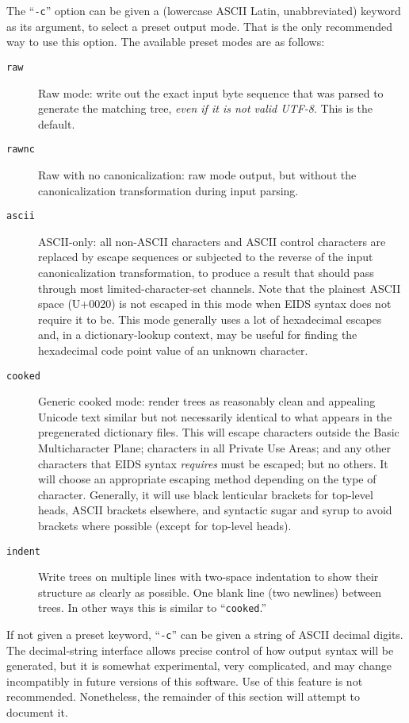 \documentclass[twocolumn]{report}
\newcommand{\DangerousBend}{\marginpar{\large\hfill\dbend\hfill\null}}
\begin{document}
The ``\texttt{-c}'' option can be given a (lowercase ASCII Latin,
unabbreviated) keyword as
its argument, to select a preset output mode.  That is the only recommended
way to use this option.  The available preset modes are as follows:
\begin{description}
  \item[\texttt{raw}] Raw mode: write out the exact input byte sequence
    that was parsed to generate the matching tree, \emph{even if it is not
    valid UTF-8}.  This is the default.
  \item[\texttt{rawnc}] Raw with no canonicalization: raw mode output,
    but without the canonicalization transformation during input parsing.
  \item[\texttt{ascii}] ASCII-only: all non-ASCII characters and ASCII
    control characters are replaced by escape sequences or subjected to
    the reverse of the input canonicalization transformation, to produce a
    result that should pass through most limited-character-set channels. 
    Note that the plainest ASCII space (U+0020) is not escaped in this mode
    when EIDS syntax does not require it to be.  This mode generally uses a
    lot of hexadecimal escapes and, in a dictionary-lookup context, may be
    useful for finding the hexadecimal code point value of an unknown
    character.
  \item[\texttt{cooked}] Generic cooked mode: render trees as reasonably
    clean and appealing Unicode text similar but not necessarily identical
    to what appears in the pregenerated dictionary files.  This will escape
    characters outside the Basic Multicharacter Plane; characters in all
    Private Use Areas; and any other characters that EIDS syntax
    \emph{requires} must be escaped; but no others.  It will choose an
    appropriate escaping method depending on the type of character. 
    Generally, it will use black lenticular brackets for top-level heads,
    ASCII brackets elsewhere, and syntactic sugar and syrup to avoid
    brackets where possible (except for top-level heads).
  \item[\texttt{indent}] Write trees on multiple lines with two-space
    indentation to show their structure as clearly as possible.  One blank
    line (two newlines) between trees.  In other ways this is similar to
    ``\texttt{cooked}.''
\end{description}

If \DangerousBend not given a preset keyword, ``\texttt{-c}'' can be given a
string of ASCII decimal digits.  The decimal-string interface allows precise
control of how output syntax will be generated, but it is somewhat
experimental, very complicated, and may change incompatibly in future
versions of this software.  Use of this feature is not recommended. 
Nonetheless, the remainder of this section will attempt to document it.
\end{document}
